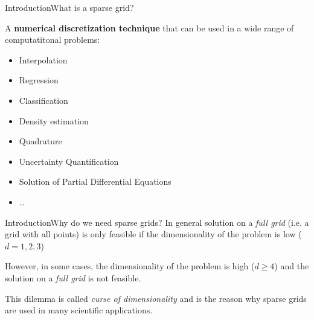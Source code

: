 \begin{frame}{Introduction}{What is a sparse grid?}

    A \textbf{numerical discretization technique} that can be used in a wide range of computatitonal problems:
    \begin{itemize}[<+->]
        \item Interpolation
        \item Regression
        \item Classification
        \item Density estimation
        \item Quadrature
        \item Uncertainty Quantification
        \item Solution of Partial Differential Equations
        \item \ldots
    \end{itemize}

\end{frame}

\begin{frame}{Introduction}{Why do we need sparse grids?}
    In general solution on a \emph{full grid} (i.e. a grid with all points) is only feasible if the dimensionality of the problem is low ($d=1,2,3$)

    \pause

    However, in some cases, the dimensionality of the problem is high ($d\ge 4$) and the solution on a \emph{full grid} is not feasible.

    \pause

    This dilemma is called \emph{curse of dimensionality} and is the reason why sparse grids are used in many scientific applications.

\end{frame}

